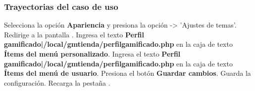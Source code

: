 \subsubsection{Trayectorias del caso de uso}

\begin{UCtrayectoria}%
%
    \Actor Selecciona la opción \textbf{Apariencia}  y presiona la opción -> 'Ajustes de temas'.
    \Sistema Redirige a la pantalla .
    \Actor Ingresa el texto \textbf{Perfil gamificado|/local/gmtienda/perfilgamificado.php} en la caja de texto \textbf{Ítems del menú personalizado}.
    \Actor Ingresa el texto \textbf{Perfil gamificado|/local/gmtienda/perfilgamificado.php} en la caja de texto \textbf{Ítems del menú de usuario}.
    \Actor Presiona el botón \textbf{Guardar cambios}.
    \Sistema Guarda la configuración.
    \Sistema Recarga la pestaña  .

\end{UCtrayectoria}
